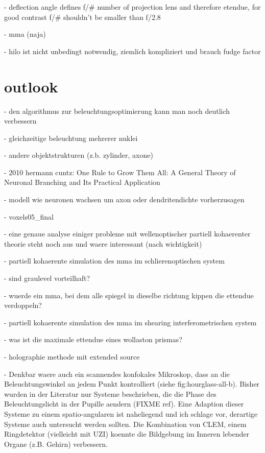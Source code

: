 \documentclass[oneside,a4paper,12pt,BCOR20mm,DIV14]{scrbook} %
\begin{document}
    - deflection angle defines f/\# number of projection lens and
      therefore etendue, for good contrast f/\# shouldn't be smaller
      than f/2.8

  - mma (naja)

- hilo ist nicht unbedingt notwendig, ziemlich kompliziert und brauch
  fudge factor

\chapter{outlook}
\label{sec:outlook}
- den algorithmus zur beleuchtungsoptimierung kann man noch deutlich
  verbessern

  - gleichzeitige beleuchtung mehrerer nuklei

  - andere objektstrukturen (z.b. zylinder, axone)

    - 2010 hermann cuntz: One Rule to Grow Them All: A General Theory
      of Neuronal Branching and Its Practical Application

      - modell wie neuronen wachsen um axon oder dendritendichte
        vorherzusagen

  - voxels05\_final

- eine genaue analyse einiger probleme mit wellenoptischer partiell
  kohaerenter theorie steht noch aus und waere interessant (nach
  wichtigkeit)

  - partiell kohaerente simulation des mma im schlierenoptischen system

    - sind graulevel vorteilhaft?

    - wuerde ein mma, bei dem alle spiegel in dieselbe richtung kippen
      die ettendue verdoppeln?

  - partiell kohaerente simulation des mma im shearing
    interferometrischen system

    - was ist die maximale ettendue eines wollaston prismas?

  - holographie methode mit extended source

  - Denkbar waere auch ein scannendes konfokales Mikroskop, dass an
    die Beleuchtungswinkel an jedem Punkt kontrolliert (siehe
    fig:hourglass-all-b).  Bisher wurden in der Literatur nur Systeme
    beschrieben, die die Phase des Beleuchtungslicht in der Pupille
    aendern (FIXME ref). Eine Adaption dieser Systeme zu einem
    spatio-angularen ist naheliegend und ich schlage vor, derartige
    Systeme auch untersucht werden sollten. Die Kombination von CLEM,
    einem Ringdetektor (vielleicht mit UZI) koennte die Bildgebung im
    Inneren lebender Organe (z.B. Gehirn) verbessern.


%


%
\end{document}
